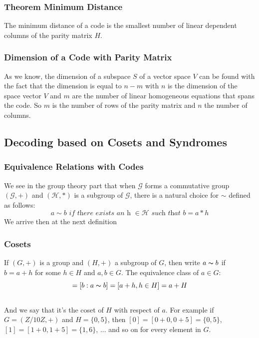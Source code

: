 \documentclass{article}
\begin{document}
\subsubsection{Theorem Minimum Distance}
The minimum distance of a code is the smallest number of linear dependent columns of the parity matrix $ H $.

\subsubsection{Dimension of a Code with Parity Matrix} As we know, the dimension of a subspace $ S $ of a vector space $ V $ can be found with the fact that the dimension is equal to $ n - m $ with $ n $ is the dimension of the space vector $ V $ and $ m $ are the number of linear homogeneous equations that spans the code. So $ m $ is the number of rows of the parity matrix and $ n $ the number of columns. 

\subsection{Decoding based on Cosets and Syndromes}
\subsubsection{Equivalence Relations with Codes}
We see in the group theory part that when $ \mathcal{G} $ forms a commutative group $ (\mathcal{G},+) $ and $ (\mathcal{H},*) $ is a subgroup of $ \mathcal{G} $, there is a natural choice for $ \sim $ defined as follows:
\begin{equation}
a \sim b \textit{ if there exists an h } \in \mathcal{H} \textit{ such that } b = a * h  
\end{equation}
We arrive then at the next definition

\subsubsection{Cosets}
If $ (G, +) $ is a group and $ (H, +) $ a subgroup of $ G $, then write $ a \thicksim b $ if $ b = a + h $ for some $ h \in H $ and $ a,b \in G $. The equivalence class of $ a \in G $:
\begin{equation}
[a] = [b: a \thicksim b] = [a + h, h \in H] = a + H
\end{equation}
\\
And we say that it's the coset of $ H $ with respect of $ a $. For example if $ G = (Z/10Z,+) $ and $ H = \{0,5\} $, then $ [0] = [0 + 0, 0 + 5] = \{0,5\} $, $ [1] = [1 + 0, 1 + 5] = \{1,6\} $, ... and so on for every element in $ G $.
\end{document}
